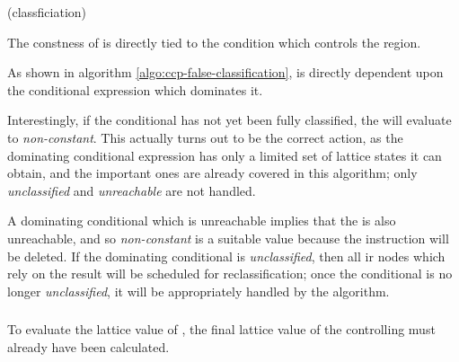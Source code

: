 \begin{algorithm}[h!]
  \label{algo:ccp-false-classification}
  \caption{ (classficiation)}
  \begin{algorithmic}[1]
    \STATE{}
    \STATE{}
    \STATE{}
    \ELSE
    \ENDIF
  \end{algorithmic}
\end{algorithm}

\begin{observation}\label{obs:ccp-false-guard}
  The constness of  is directly tied to the condition
  which controls the region.
\end{observation}

As shown in algorithm \ref{algo:ccp-false-classification},
 is directly dependent upon the conditional expression
which dominates it.

Interestingly, if the conditional has not yet been fully classified,
the  will evaluate to \emph{non-constant}.  This
actually turns out to be the correct action, as the dominating
conditional expression has only a limited set of lattice states it can
obtain, and the important ones are already covered in this algorithm;
only \emph{unclassified} and \emph{unreachable} are not handled.

A dominating conditional which is unreachable implies that the
 is also unreachable, and so \emph{non-constant} is a
suitable value because the instruction will be deleted.  If the
dominating conditional is \emph{unclassified}, then all \ac{ir} nodes
which rely on the result will be scheduled for reclassification; once
the conditional is no longer \emph{unclassified}, it will be
appropriately handled by the algorithm.

\subsubsection{}
To evaluate the lattice value of , the
final lattice value of the controlling 
must already have been calculated.

